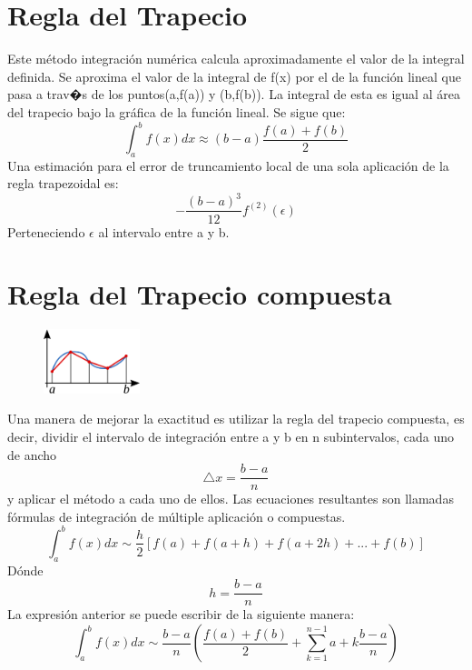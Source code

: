 


\section{Regla del Trapecio}
\label{2:sec:1}
\parindent=0.5cm
\raggedright
Este método integración numérica calcula aproximadamente el valor de la integral definida. 
Se aproxima el valor de la integral de f(x) por el de la función lineal que pasa 
a trav�s de los puntos(a,f(a)) y (b,f(b)). La integral de esta es igual al área del 
trapecio bajo la gráfica de la función lineal. Se sigue que: 
\[
\int_{a}^{b} f(x)dx \approx\left(b-a\right)\frac{f(a)+f(b)}{2} 
\]
Una estimación para el error de truncamiento local de una sola aplicación de la regla trapezoidal es:
\[
-\frac{\left(b-a\right)^3}{12}  \displaystyle f^{(2)}(\epsilon)
\]
Perteneciendo $\epsilon$ al intervalo entre a y b.

\section{Regla del Trapecio compuesta}
\label{2:sec:2}





\begin{figure}[!th]
\begin{center}
\includegraphics[width=0.25\textwidth]{images/Regla-Trap-compuesta}
\end{center}
\end{figure}
\parindent=0.5cm
\raggedright
Una manera de mejorar la exactitud es utilizar la regla del trapecio compuesta, es decir, dividir
el intervalo de integración entre a y b en n subintervalos, cada uno de ancho
\[
\bigtriangleup{x}=\frac{b-a}{n}
\]
y aplicar el método a cada uno de ellos. Las ecuaciones resultantes son llamadas fórmulas
de integración de múltiple aplicación o compuestas.
\[
\int_{a}^{b} f(x)dx \sim\frac{h}{2}\left[f(a) + f(a+h) + f(a+2h) + ... + f(b)\right]
\]
Dónde 
\[
h=\frac{b-a}{n} 
\]
La expresión anterior se puede escribir de la siguiente manera:
\[
\int_{a}^{b} f(x)dx \sim\frac{b-a}{n}\left(\frac{f(a)+f(b)}{2} + \sum_{k=1}^{n-1} a+k\frac{b-a}{n} \right)
\]

